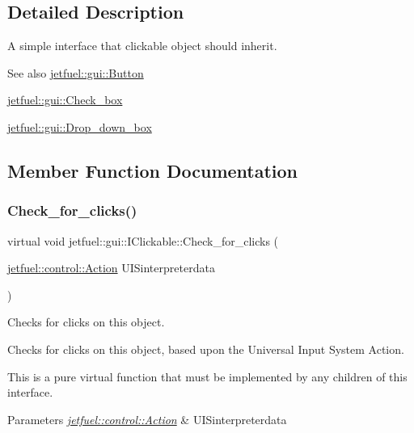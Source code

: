 \subsection{Detailed Description}
A simple interface that clickable object should inherit.

\begin{DoxySeeAlso}{See also}
\hyperlink{classjetfuel_1_1gui_1_1Button}{jetfuel\+::gui\+::\+Button} 

\hyperlink{classjetfuel_1_1gui_1_1Check__box}{jetfuel\+::gui\+::\+Check\+\_\+box} 

\hyperlink{classjetfuel_1_1gui_1_1Drop__down__box}{jetfuel\+::gui\+::\+Drop\+\_\+down\+\_\+box} 
\end{DoxySeeAlso}


\subsection{Member Function Documentation}
\mbox{\label{classjetfuel_1_1gui_1_1IClickable_aea45de37bd3beb7eb7e2e3056e4e37b3}} 
\subsubsection{\texorpdfstring{Check\+\_\+for\+\_\+clicks()}{Check\_for\_clicks()}}
{\footnotesize\ttfamily virtual void jetfuel\+::gui\+::\+I\+Clickable\+::\+Check\+\_\+for\+\_\+clicks (\begin{DoxyParamCaption}\item[{\hyperlink{structjetfuel_1_1control_1_1Action}{jetfuel\+::control\+::\+Action}}]{U\+I\+Sinterpreterdata }\end{DoxyParamCaption})\hspace{0.3cm}{\ttfamily [pure virtual]}}



Checks for clicks on this object. 

Checks for clicks on this object, based upon the Universal Input System Action.

This is a pure virtual function that must be implemented by any children of this interface.


\begin{DoxyParams}{Parameters}
{\em \hyperlink{structjetfuel_1_1control_1_1Action}{jetfuel\+::control\+::\+Action}} & U\+I\+Sinterpreterdata \\
\hline
\end{DoxyParams}


